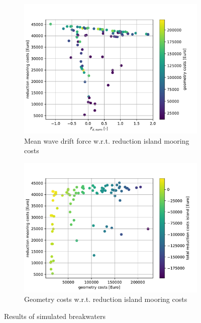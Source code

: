 \begin{figure}[h]
    \centering
    \begin{subfigure}[b]{0.49\textwidth}
        \centering
        \includegraphics[width=\linewidth]{figures/ComFLOW/Results DI1/costs/Fd_norm_VS_cost_reduction_mooring.pdf}
        \caption[]%
        {{\small Mean wave drift force w.r.t. reduction island mooring costs}}    
        \label{fig: Fd_norm_VS cost reduction mooring H3 DI1 captive}
    \end{subfigure}
    \hfill
    \begin{subfigure}[b]{0.49\textwidth}  
        \centering 
        \includegraphics[width=\linewidth]{figures/ComFLOW/Results DI1/costs/geometrycosts_VS_cost_reduction_mooring.pdf}
        \caption[]%
        {{\small Geometry costs w.r.t. reduction island mooring costs}}    
        \label{fig:  geometrycosts vs cost reduction mooring H3 DI1 captive}
    \end{subfigure}
    
    \caption{Results of simulated breakwaters}
    \label{fig: }
\end{figure}



